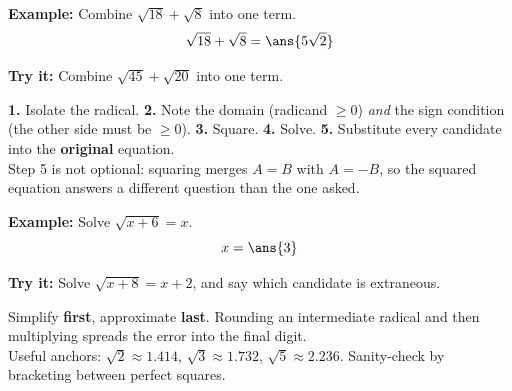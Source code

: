 \documentclass[12pt]{article}
\begin{document}
\begin{examplebox}
\textbf{Example:} Combine $\sqrt{18} + \sqrt{8}$ into one term.
\[ \sqrt{18} + \sqrt{8} = \ans{5\sqrt{2}} \]
\end{examplebox}

\begin{tryitbox}
\textbf{Try it:} Combine $\sqrt{45} + \sqrt{20}$ into one term.\\[2pt]
\end{tryitbox}


\begin{formulabox}
\textbf{1.} Isolate the radical. \quad \textbf{2.} Note the domain (radicand
$\geq 0$) \emph{and} the sign condition (the other side must be $\geq 0$).
\quad \textbf{3.} Square. \quad \textbf{4.} Solve. \quad \textbf{5.} Substitute
every candidate into the \textbf{original} equation.\\[2pt]
Step 5 is not optional: squaring merges $A = B$ with $A = -B$, so the squared
equation answers a different question than the one asked.
\end{formulabox}

\begin{examplebox}
\textbf{Example:} Solve $\sqrt{x+6} = x$.
\[ x = \ans{3} \]
\end{examplebox}

\begin{tryitbox}
\textbf{Try it:} Solve $\sqrt{x+8} = x + 2$, and say which candidate is
extraneous.\\[2pt]
\end{tryitbox}


\begin{formulabox}
Simplify \textbf{first}, approximate \textbf{last}. Rounding an intermediate
radical and then multiplying spreads the error into the final digit.\\[2pt]
Useful anchors: $\sqrt{2} \approx 1.414$, $\sqrt{3} \approx 1.732$,
$\sqrt{5} \approx 2.236$. Sanity-check by bracketing between perfect squares.
\end{formulabox}
\end{document}
